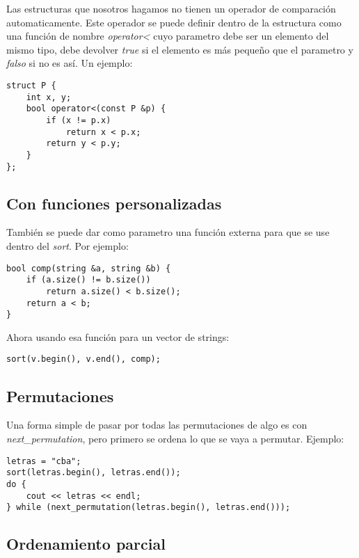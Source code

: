 \documentclass[10pt]{article}
\begin{document}
Las estructuras que nosotros hagamos no tienen un operador de comparación automaticamente. Este operador se puede definir dentro de la estructura como una función de nombre \textit{operator<} cuyo parametro debe ser un elemento del mismo tipo, debe devolver \textit{true} si el elemento es más pequeño que el parametro y \textit{falso} si no es así. Un ejemplo:

\begin{lstlisting}
struct P {
    int x, y;
    bool operator<(const P &p) {
        if (x != p.x)
            return x < p.x;
        return y < p.y;
    }
};
\end{lstlisting}

\subsection{Con funciones personalizadas}

También se puede dar como parametro una función externa para que se use dentro del \textit{sort}. Por ejemplo:

\begin{lstlisting}
bool comp(string &a, string &b) {
    if (a.size() != b.size())
        return a.size() < b.size();
    return a < b;
}
\end{lstlisting}

Ahora usando esa función para un vector de strings:

\begin{lstlisting}
sort(v.begin(), v.end(), comp);
\end{lstlisting}

\subsection{Permutaciones}

Una forma simple de pasar por todas las permutaciones de algo es con \textit{next\_permutation}, pero primero se ordena lo que se vaya a permutar. Ejemplo:

\begin{lstlisting}
letras = "cba";
sort(letras.begin(), letras.end());
do {
    cout << letras << endl;
} while (next_permutation(letras.begin(), letras.end()));
\end{lstlisting}

\subsection{Ordenamiento parcial}
\end{document}

